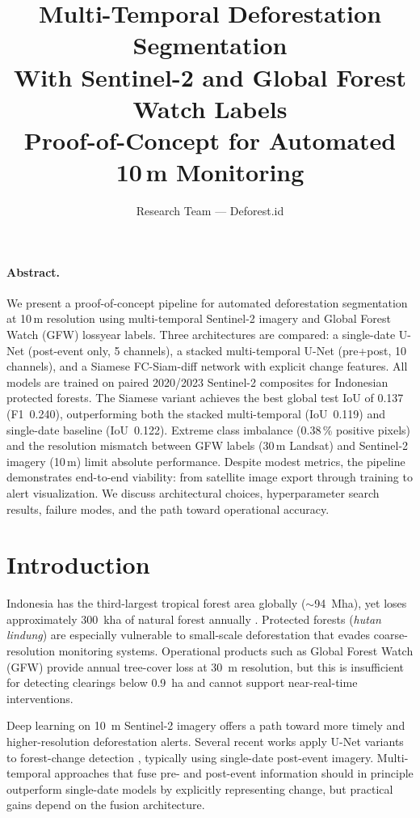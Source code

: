 \documentclass[10pt,a4paper,onecolumn]{article}
\title{\textbf{Multi-Temporal Deforestation Segmentation \\
With Sentinel-2 and Global Forest Watch Labels} \\
\small Proof-of-Concept for Automated 10\,m Monitoring}
\author{Research Team --- Deforest.id}
\date{}
\begin{document}
\maketitle
\thispagestyle{empty}

\paragraph{Abstract.}
We present a proof-of-concept pipeline for automated deforestation
segmentation at 10\,m resolution using multi-temporal Sentinel-2
imagery and Global Forest Watch (GFW) lossyear labels.  Three
architectures are compared: a single-date U-Net (post-event only, 5
channels), a stacked multi-temporal U-Net (pre+post, 10 channels), and
a Siamese FC-Siam-diff network with explicit change features.  All
models are trained on paired 2020/2023 Sentinel-2 composites for
Indonesian protected forests.  The Siamese variant achieves the best
global test IoU of 0.137 (F1~0.240), outperforming both the stacked
multi-temporal (IoU~0.119) and single-date baseline (IoU~0.122).
Extreme class imbalance (0.38\,\% positive pixels) and the resolution
mismatch between GFW labels (30\,m Landsat) and Sentinel-2 imagery
(10\,m) limit absolute performance.  Despite modest metrics, the
pipeline demonstrates end-to-end viability: from satellite image
export through training to alert visualization.  We discuss
architectural choices, hyperparameter search results, failure modes,
and the path toward operational accuracy.

\section{Introduction}

Indonesia has the third-largest tropical forest area globally
($\sim$94~Mha), yet loses approximately 300~kha of natural forest
annually \cite{hansen2013high}.  Protected forests (\textit{hutan
lindung}) are especially vulnerable to small-scale deforestation that
evades coarse-resolution monitoring systems.  Operational products
such as Global Forest Watch (GFW) provide annual tree-cover loss at
30~m resolution, but this is insufficient for detecting clearings
below 0.9~ha and cannot support near-real-time interventions.

Deep learning on 10~m Sentinel-2 imagery offers a path toward more
timely and higher-resolution deforestation alerts.  Several recent
works apply U-Net variants to forest-change detection
\cite{wagner2019change, zapata2022deforestation}, typically using
single-date post-event imagery.  Multi-temporal approaches that fuse
pre- and post-event information should in principle outperform
single-date models by explicitly representing change, but practical
gains depend on the fusion architecture.
\end{document}
